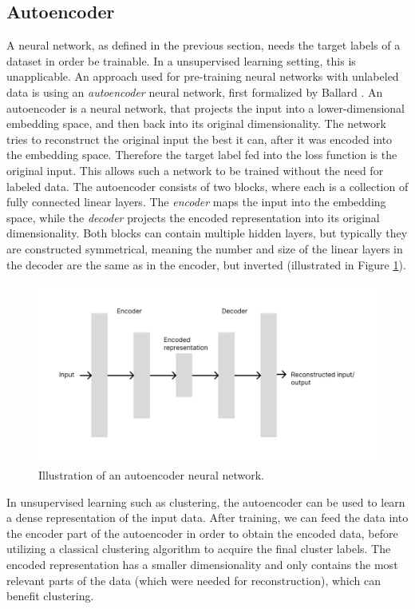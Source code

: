 \subsection{Autoencoder}

A neural network, as defined in the previous section, needs the target labels of a dataset in order be trainable. In a unsupervised learning setting, this is unapplicable. An approach used for pre-training neural networks with unlabeled data is using an \textit{autoencoder} neural network, first formalized by Ballard \cite{autoencoder}. An autoencoder is a neural network, that projects the input into a lower-dimensional embedding space, and then back into its original dimensionality. The network tries to reconstruct the original input the best it can, after it was encoded into the embedding space. Therefore the target label fed into the loss function is the original input. This allows such a network to be trained without the need for labeled data. The autoencoder consists of two blocks, where each is a collection of fully connected linear layers. The \textit{encoder} maps the input into the embedding space, while the \textit{decoder} projects the encoded representation into its original dimensionality. Both blocks can contain multiple hidden layers, but typically they are constructed symmetrical, meaning the number and size of the linear layers in the decoder are the same as in the encoder, but inverted (illustrated in Figure \ref{autoencoder_illustration}). 

\begin{figure}
\centering
	\includegraphics[width=1.1\linewidth]{autoencoder.png}
	\caption{Illustration of an autoencoder neural network.}
	\label{autoencoder_illustration}
\end{figure}

In unsupervised learning such as clustering, the autoencoder can be used to learn a dense representation of the input data. After training, we can feed the data into the encoder part of the autoencoder in order to obtain the encoded data, before utilizing a classical clustering algorithm to acquire the final cluster labels. The encoded representation has a smaller dimensionality and only contains the most relevant parts of the data (which were needed for reconstruction), which can benefit clustering.

